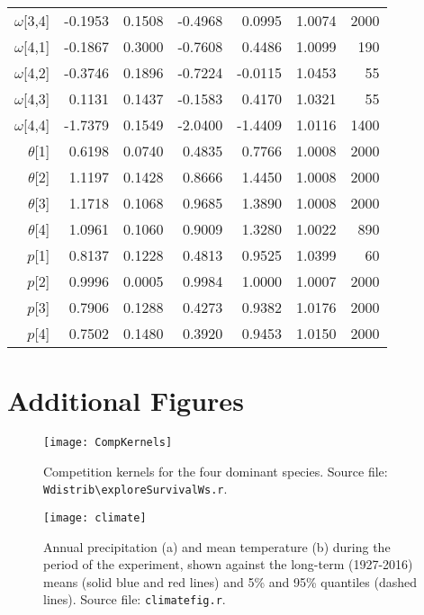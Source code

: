 \documentclass[11pt]{article}
\begin{document}
\begin{table}[ht]
\begin{tabular}{rrrrrrr}
  $\omega$[3,4] & -0.1953 & 0.1508 & -0.4968 & 0.0995 & 1.0074 &  2000 \\ 
  $\omega$[4,1] & -0.1867 & 0.3000 & -0.7608 & 0.4486 & 1.0099 &   190 \\ 
  $\omega$[4,2] & -0.3746 & 0.1896 & -0.7224 & -0.0115 & 1.0453 &    55 \\ 
  $\omega$[4,3] & 0.1131 & 0.1437 & -0.1583 & 0.4170 & 1.0321 &    55 \\ 
  $\omega$[4,4] & -1.7379 & 0.1549 & -2.0400 & -1.4409 & 1.0116 &  1400 \\ 
   $\theta$[1] & 0.6198 & 0.0740 & 0.4835 & 0.7766 & 1.0008 &  2000 \\ 
   $\theta$[2] & 1.1197 & 0.1428 & 0.8666 & 1.4450 & 1.0008 &  2000 \\ 
   $\theta$[3] & 1.1718 & 0.1068 & 0.9685 & 1.3890 & 1.0008 &  2000 \\ 
  $\theta$[4] & 1.0961 & 0.1060 & 0.9009 & 1.3280 & 1.0022 &   890 \\ 
  $p$[1] & 0.8137 & 0.1228 & 0.4813 & 0.9525 & 1.0399 &    60 \\ 
  $p$[2] & 0.9996 & 0.0005 & 0.9984 & 1.0000 & 1.0007 &  2000 \\ 
  $p$[3] & 0.7906 & 0.1288 & 0.4273 & 0.9382 & 1.0176 &  2000 \\ 
  $p$[4] & 0.7502 & 0.1480 & 0.3920 & 0.9453 & 1.0150 &  2000 \\ 
   \hline
\end{tabular}
\end{table}


\clearpage

\section{Additional Figures} 


 \begin{figure}[h]
 \centering
 \texttt{[image: CompKernels]}
 \caption{Competition kernels for the four dominant species. Source file: \texttt{Wdistrib\textbackslash exploreSurvivalWs.r}. }
 \label{fig:CompKernels}
 \end{figure}
 
  \begin{figure}[h]
  \centering
  \texttt{[image: climate]}
  \caption{Annual precipitation (a) and mean temperature (b) during the period of the experiment, shown against the long-term (1927-2016) means (solid blue and red lines) and 5\% and 95\% quantiles (dashed lines). Source file:  \texttt{climate\textunderscore fig.r}.}
  \label{fig:climate}
  \end{figure}
  
\end{document}
